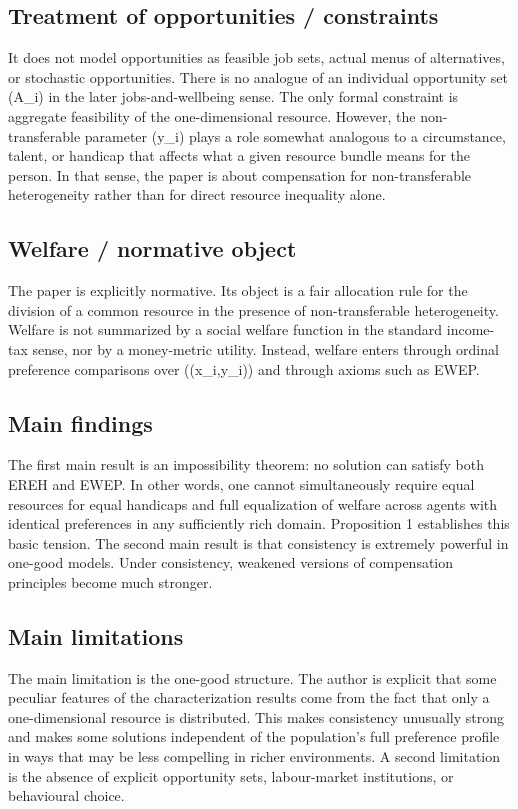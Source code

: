 \documentclass[11pt,a4paper]{article}
\begin{document}
\subsection*{Treatment of opportunities / constraints}
It does not model opportunities as feasible job sets, actual menus of alternatives, or stochastic opportunities. There is no analogue of an individual opportunity set (A\_i) in the later jobs-and-wellbeing sense. The only formal constraint is aggregate feasibility of the one-dimensional resource. However, the non-transferable parameter (y\_i) plays a role somewhat analogous to a circumstance, talent, or handicap that affects what a given resource bundle means for the person. In that sense, the paper is about compensation for non-transferable heterogeneity rather than for direct resource inequality alone.

\subsection*{Welfare / normative object}
The paper is explicitly normative. Its object is a fair allocation rule for the division of a common resource in the presence of non-transferable heterogeneity. Welfare is not summarized by a social welfare function in the standard income-tax sense, nor by a money-metric utility. Instead, welfare enters through ordinal preference comparisons over ((x\_i,y\_i)) and through axioms such as EWEP.

\subsection*{Main findings}
The first main result is an impossibility theorem: no solution can satisfy both EREH and EWEP. In other words, one cannot simultaneously require equal resources for equal handicaps and full equalization of welfare across agents with identical preferences in any sufficiently rich domain. Proposition 1 establishes this basic tension. The second main result is that consistency is extremely powerful in one-good models. Under consistency, weakened versions of compensation principles become much stronger.

\subsection*{Main limitations}
The main limitation is the one-good structure. The author is explicit that some peculiar features of the characterization results come from the fact that only a one-dimensional resource is distributed. This makes consistency unusually strong and makes some solutions independent of the population’s full preference profile in ways that may be less compelling in richer environments. A second limitation is the absence of explicit opportunity sets, labour-market institutions, or behavioural choice.
\end{document}
